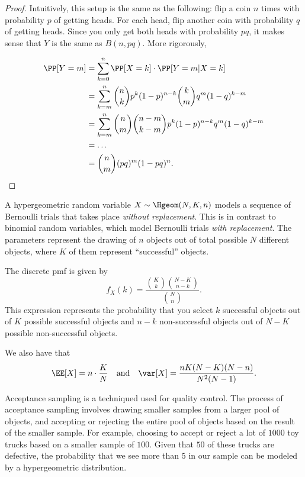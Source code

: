\begin{proof}
Intuitively, this setup is the same as the following: flip a coin $n$ times with probability $p$ of getting heads. For each head, flip another coin with probability $q$ of getting heads. Since you only get both heads with probability $pq$, it makes sense that $Y$ is the same as $B(n, pq)$. More rigorously, 

\begin{align*}
    \PP[Y = m] &= \sum_{k=0}^n \PP[X = k]\cdot \PP[Y=m | X=k] \\
    &= \sum_{k=m}^n \binom{n}{k}p^k(1-p)^{n-k}\binom{k}{m}q^m(1-q)^{k-m} \\
    &= \sum_{k=m}^n \binom{n}{m}\binom{n-m}{k-m}p^k(1-p)^{n-k}q^m(1-q)^{k-m} \\
    &= \hdots \\
    &= \binom{n}{m}(pq)^m(1-pq)^n.
\end{align*}
\end{proof}

\begin{definition}

A \ac{hypergeometric} random variable $X\sim \Hgeom(N, K, n)$ models a sequence of Bernoulli trials that takes place \textit{without replacement}. This is in contrast to binomial random variables, which model Bernoulli trials \textit{with replacement}. The parameters represent the drawing of $n$ objects out of total possible $N$ different objects, where $K$ of them represent ``successful'' objects. 
\end{definition}
The discrete pmf is given by 
\[f_X(k) = \frac{\binom{K}{k}\binom{N-K}{n-k}}{\binom{N}{n}}.\]
This expression represents the probability that you select $k$ successful objects out of $K$ possible successful objects and $n-k$ non-successful objects out of $N-K$ possible non-successful objects. 

We also have that 
\[\EE[X] = n\cdot \frac{K}{N}\quad \text{and}\quad \var[X] = \frac{nK(N-K)(N-n)}{N^2(N-1)}.\]

\begin{example}
\exlabel

Acceptance sampling is a techniqued used for quality control. The process of acceptance sampling involves drawing smaller samples from a larger pool of objects, and accepting or rejecting the entire pool of objects based on the result of the smaller sample. For example, choosing to accept or reject a lot of $1000$ toy trucks based on a smaller sample of $100$. Given that $50$ of these trucks are defective, the probability that we see more than $5$ in our sample can be modeled by a hypergeometric distribution. 
\end{example}

